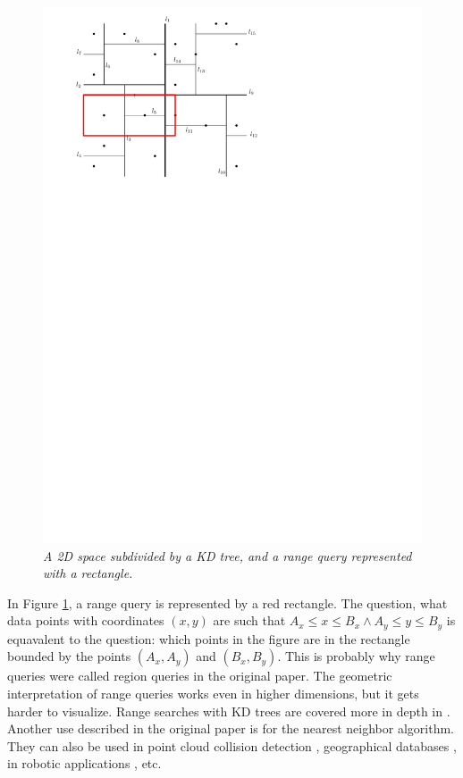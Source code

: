 \documentclass[12pt]{article}
\begin{document}
\begin{figure}
\centering
\includegraphics{figs/kdTreePlaneRectangle}
\caption{\textit{A 2D space subdivided by a KD tree, and a range query represented with a rectangle.}}
\label{figure:kdprect}
\end{figure}
In Figure \ref{figure:kdprect}, a range query is represented by a red rectangle. The question, what data points with coordinates $(x, y)$ are such that $A_x \leq x \leq B_x \land A_y \leq y\leq B_y$ is equavalent to the question: which points in the figure are in the rectangle bounded by the points $(A_x, A_y)$ and $(B_x, B_y)$. This is probably why range queries were called region queries in the original paper. The geometric interpretation of range queries works even in higher dimensions, but it gets harder to visualize. Range searches with KD trees are covered more in depth in \cite{kakde2005range}.\\
\indent Another use described in the original paper is for the nearest neighbor algorithm. They can also be used in point cloud collision detection \cite{schauer2015collision}, geographical databases \cite{ooi1987spatial}, in robotic applications \cite{cai2021ikd}, etc.
\end{document}
